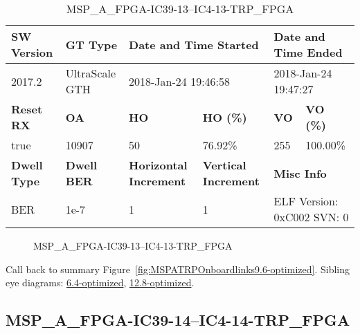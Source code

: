 \begin{table}[h]
\centering
\caption{MSP\_A\_FPGA-IC39-13--IC4-13-TRP\_FPGA}
\label{tab:MSPAFPGAIC3913IC413TRPFPGA9.6-optimized}
\begin{tabular}{@{}|l|l|l|l|l|l|@{}}
\toprule
\textbf{SW Version}                & \textbf{GT Type}   & \multicolumn{2}{l|}{\textbf{Date and Time Started}}            & \multicolumn{2}{l|}{\textbf{Date and Time Ended}}        \\ \midrule
2017.2                       & UltraScale GTH          & \multicolumn{2}{l|}{2018-Jan-24 19:46:58}                   & \multicolumn{2}{l|}{2018-Jan-24 19:47:27}               \\ \midrule
\textbf{Reset RX}                  & \textbf{OA} & \textbf{HO}   & \textbf{HO (\%)} & \textbf{VO} & \textbf{VO (\%)} \\ \midrule
true & 10907        & 50          & 76.92\%        & 255        & 100.00\%       \\ \midrule
\textbf{Dwell Type}                & \textbf{Dwell BER} & \textbf{Horizontal Increment} & \textbf{Vertical Increment}    & \multicolumn{2}{l|}{\textbf{Misc Info}}                  \\ \midrule
BER                            & 1e-7        & 1        & 1           & \multicolumn{2}{l|}{ELF Version: 0xC002 SVN: 0}                         \\ \bottomrule
\end{tabular}
\end{table}

\begin{figure}[h]
\caption{MSP\_A\_FPGA-IC39-13--IC4-13-TRP\_FPGA} \label{fig:MSPAFPGAIC3913IC413TRPFPGA9.6-optimized}
\end{figure}

Call back to summary Figure~\ref{fig:MSPATRPOnboardlinks9.6-optimized}.
Sibling eye diagrams: \hyperref[sec:MSPAFPGAIC3913IC413TRPFPGA6.4-optimized]{6.4-optimized}, \hyperref[sec:MSPAFPGAIC3913IC413TRPFPGA12.8-optimized]{12.8-optimized}.

\clearpage
\newpage


\subsection{MSP\_A\_FPGA-IC39-14--IC4-14-TRP\_FPGA}\label{sec:MSPAFPGAIC3914IC414TRPFPGA9.6-optimized}

